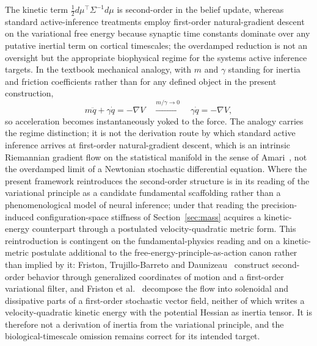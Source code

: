 \documentclass[11pt]{article}
\begin{document}
The kinetic term $\tfrac{1}{2}d\mu^\top \Sigma^{-1} d\mu$ is second-order in the belief update, whereas standard active-inference treatments employ first-order natural-gradient descent on the variational free energy because synaptic time constants dominate over any putative inertial term on cortical timescales; the overdamped reduction is not an oversight but the appropriate biophysical regime for the systems active inference targets. In the textbook mechanical analogy, with $m$ and $\gamma$ standing for inertia and friction coefficients rather than for any defined object in the present construction,
\begin{equation}
m\ddot{q} + \gamma\dot{q} = -\nabla V \quad \xrightarrow{m/\gamma \to 0} \quad \gamma\dot{q} = -\nabla V,
\end{equation}
so acceleration becomes instantaneously yoked to the force. The analogy carries the regime distinction; it is not the derivation route by which standard active inference arrives at first-order natural-gradient descent, which is an intrinsic Riemannian gradient flow on the statistical manifold in the sense of Amari~\cite{Amari1998}, not the overdamped limit of a Newtonian stochastic differential equation. Where the present framework reintroduces the second-order structure is in its reading of the variational principle as a candidate fundamental scaffolding rather than a phenomenological model of neural inference; under that reading the precision-induced configuration-space stiffness of Section~\ref{sec:mass} acquires a kinetic-energy counterpart through a postulated velocity-quadratic metric form. This reintroduction is contingent on the fundamental-physics reading and on a kinetic-metric postulate additional to the free-energy-principle-as-action canon rather than implied by it: Friston, Trujillo-Barreto and Daunizeau~\cite{Friston2008DEM} construct second-order behavior through generalized coordinates of motion and a first-order variational filter, and Friston et al.~\cite{Friston2023PhysReports} decompose the flow into solenoidal and dissipative parts of a first-order stochastic vector field, neither of which writes a velocity-quadratic kinetic energy with the potential Hessian as inertia tensor. It is therefore not a derivation of inertia from the variational principle, and the biological-timescale omission remains correct for its intended target.
\end{document}
